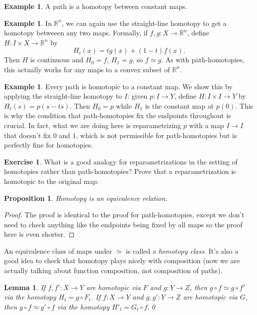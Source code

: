 \documentclass{article}
\newtheorem{lem}[thm]{Lemma}
\newtheorem{prop}[thm]{Proposition}
\theoremstyle{definition}
\newtheorem{exa}[thm]{Example}
\newtheorem{exer}[thm]{Exercise}
\theoremstyle{remark}
\newcommand{\R}{\mathbb R}
\numberwithin{figure}{section}
\begin{document}
\begin{exa}
	A path is a homotopy between constant maps.
\end{exa}

\begin{exa}
	In $\R^n$, we can again use the straight-line homotopy to get a homotopy betweeen any two maps. Formally, if $f, g : X \to \R^n$, define $H : I \times X \to \R^n$ by
	\[
	H_t(x) = tg(x) + (1 - t)f(x).
	\]
	Then $H$ is continuous and $H_0 = f$, $H_1 = g$, so $f \simeq g$. As with path-homotopies, this actually works for any maps to a convex subset of $\R^n$.
\end{exa}

\begin{exa}
	Every path is homotopic to a constant map. We show this by applying the straight-line homotopy to $I$: given $p : I \to Y$, define $H : I \times I \to Y$ by $H_t(s) = p(s - ts)$. Then $H_0 = p$ while $H_1$ is the constant map at $p(0)$. This is why the condition that path-homotopies fix the endpoints throughout is crucial. In fact, what we are doing here is reparametrizing $p$ with a map $I \to I$ that doesn't fix $0$ and $1$, which is not permissible for path-homotopies but is perfectly fine for homotopies.
\end{exa}

\begin{exer}
	What is a good analogy for reparametrizations in the setting of homotopies rather than path-homotopies? Prove that a reparametrization is homotopic to the original map.
\end{exer}

\begin{prop}
	Homotopy is an equivalence relation.
\end{prop}

\begin{proof}
	The proof is identical to the proof for path-homotopies, except we don't need to check anything like the endpoints being fixed by all maps so the proof here is even shorter.
\end{proof}

An equivalence class of maps under $\simeq$ is called a \emph{homotopy class}. It's also a good idea to check that homotopy plays nicely with composition (now we are actually talking about function composition, not composition of paths).

\begin{lem}\label{lem:homotopy composition}
	If $f, f' : X \to Y$ are homotopic via $F$ and $g : Y \to Z$, then $g \circ f \simeq g \circ f'$ via the homotopy $H_t = g \circ F_t$. If $f : X \to Y$ and $g, g' : Y \to Z$ are homotopic via $G$, then $g \circ f \simeq g' \circ f$ via the homotopy $H'_t = G_t \circ f$.\qed
\end{lem}
\end{document}
